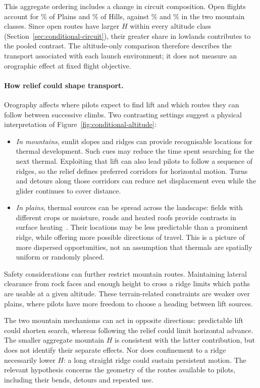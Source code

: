 This aggregate ordering includes a change in circuit composition. Open flights
account for \ChThreeConditionalPlainsOpenPct\% of Plains and
\ChThreeConditionalHillsOpenPct\% of Hills, against
\ChThreeConditionalLowMountainsOpenPct\% and
\ChThreeConditionalHighMountainsOpenPct\% in the two mountain classes.
Since open routes have larger $H$ within every altitude class
(Section~\ref{sec:conditional-circuit}), their greater share
in lowlands contributes to the pooled contrast. The altitude-only comparison
therefore describes the transport associated with each launch environment; it
does not measure an orographic effect at fixed flight objective.

\paragraph{How relief could shape transport.}
Orography affects where pilots expect to find lift and which routes they can
follow between successive climbs. Two contrasting settings suggest a physical
interpretation of Figure~\ref{fig:conditional-altitude}:
\begin{itemize}
 \item \emph{In mountains}, sunlit slopes and ridges can provide recognisable
 locations for thermal development. Such cues may reduce the time spent searching
 for the next thermal. Exploiting that lift can also lead pilots to follow a
 sequence of ridges, so the relief defines preferred corridors for horizontal
 motion. Turns and detours along those corridors can reduce net displacement
 even while the glider continues to cover distance.
 \item \emph{In plains}, thermal sources can be spread across the landscape:
 fields with different crops or moisture, roads and heated roofs provide contrasts
 in surface heating~\cite{faa_glider2024}. Their locations may be less predictable
 than a prominent ridge, while offering more possible directions of travel.
 This is a picture of more dispersed opportunities, not an assumption that
 thermals are spatially uniform or randomly placed.
\end{itemize}

Safety considerations can further restrict mountain routes. Maintaining lateral
clearance from rock faces and enough height to cross a ridge limits which paths
are usable at a given altitude. These terrain-related constraints are weaker over
plains, where pilots have more freedom to choose a heading between lift sources.

The two mountain mechanisms can act in opposite directions: predictable lift
could shorten search, whereas following the relief could limit horizontal advance.
The smaller aggregate mountain $H$ is consistent with the latter contribution,
but does not identify their separate effects. Nor does confinement to a ridge
necessarily lower $H$: a long straight ridge could sustain persistent motion.
The relevant hypothesis concerns the geometry of the routes available to pilots,
including their bends, detours and repeated use.

